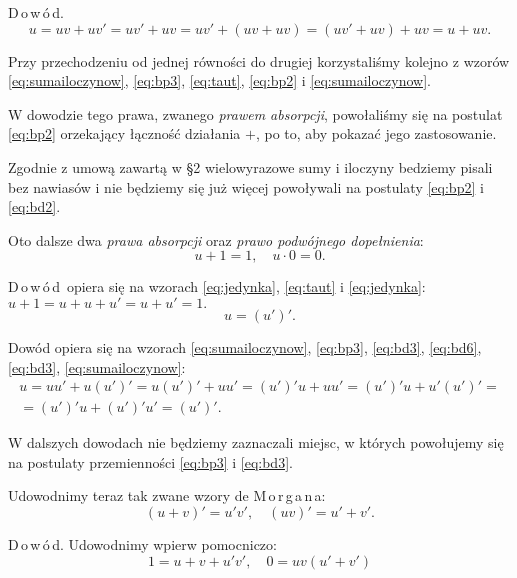 \documentclass[12 pt, a4paper, leqno]{book}
\numberwithin{equation}{section}
\newcommand{\dowod}{D\,o\,w\,ó\,d}
\theoremstyle{twr}
\theoremstyle{twr}
\theoremstyle{eqtext}
\theoremstyle{okreslenie}
\begin{document}
\dowod.
\begin{displaymath}
u = uv + uv' = uv' + uv = uv' + (uv + uv) = (uv' + uv) + uv = u + uv.
\end{displaymath}

Przy przechodzeniu od jednej równości do drugiej korzystaliśmy kolejno z wzorów \eqref{eq:sumailoczynow}, \eqref{eq:bp3}, \eqref{eq:taut},
\eqref{eq:bp2} i \eqref{eq:sumailoczynow}.

W dowodzie tego prawa, zwanego \textit{prawem absorpcji}, powołaliśmy się na postulat \eqref{eq:bp2} orzekający łączność działania $+$, po to,
aby pokazać jego zastosowanie.

Zgodnie z umową zawartą w \S 2 wielowyrazowe sumy i iloczyny bedziemy pisali bez nawiasów i nie będziemy się już więcej powoływali na postulaty 
\eqref{eq:bp2} i \eqref{eq:bd2}.

Oto dalsze dwa \textit{prawa absorpcji} oraz \textit{prawo podwójnego dopełnienia}:
\begin{equation} \label{eq:absorpcja2}
u + 1 = 1, \quad u \cdot 0 = 0.
\end{equation}

\dowod\ opiera się na wzorach \eqref{eq:jedynka}, \eqref{eq:taut} i \eqref{eq:jedynka}: $u + 1 = u + u + u' = u + u' = 1.$
\begin{equation} \label{eq:2przeczenie}
u = (u')'.
\end{equation}

Dowód opiera się na wzorach \eqref{eq:sumailoczynow}, \eqref{eq:bp3}, \eqref{eq:bd3}, \eqref{eq:bd6}, \eqref{eq:bd3}, \eqref{eq:sumailoczynow}:
\begin{gather*}
u = uu' + u(u')' = u(u')' + uu' = (u')'u + uu' = (u')'u + u'(u')' = \\
= (u')'u + (u')'u' = (u')'.
\end{gather*}

W dalszych dowodach nie będziemy zaznaczali miejsc, w których powołujemy się na postulaty przemienności \eqref{eq:bp3} i \eqref{eq:bd3}.

Udowodnimy teraz tak zwane wzory de M\,o\,r\,g\,a\,n\,a:
\begin{equation} \label{eq:morgan}
(u + v)' = u'v', \quad (uv)' = u' + v'.
\end{equation}

\dowod. Udowodnimy wpierw pomocniczo:
\begin{equation*} \tag{a}
  1 = u + v + u'v', \quad 0 = uv(u' + v')
\end{equation*}
\end{document}
